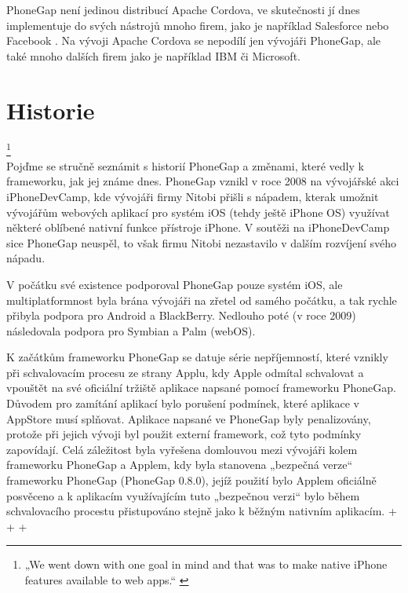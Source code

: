 PhoneGap není jedinou distribucí Apache Cordova, ve skutečnosti jí dnes implementuje do svých nástrojů mnoho firem, jako je například Salesforce nebo Facebook \cite{cordova_name}. Na vývoji Apache Cordova se nepodílí jen vývojáři PhoneGap, ale také mnoho dalších firem jako je například IBM či Microsoft.

\section{Historie}
\textit{\cite{phonegap_announcement}}
\footnote{„We went down with one goal in mind and that was to make native iPhone features available to web apps.“ \cite{phonegap_announcement}} \\

Pojďme se stručně seznámit s historií PhoneGap a změnami, které vedly k frameworku, jak jej známe dnes. PhoneGap vznikl v roce 2008 na vývojářské akci iPhoneDevCamp, kde vývojáři firmy Nitobi přišli s nápadem, kterak umožnit vývojářům webových aplikací pro systém iOS (tehdy ještě iPhone OS) využívat některé oblíbené nativní funkce přístroje iPhone. V soutěži na iPhoneDevCamp sice PhoneGap neuspěl, to však firmu Nitobi nezastavilo v dalším rozvíjení svého nápadu.

V počátku své existence podporoval PhoneGap pouze systém iOS, ale multiplatformnost byla brána vývojáři na zřetel od samého počátku, a tak rychle přibyla podpora pro Android a BlackBerry. Nedlouho poté (v roce 2009) následovala podpora pro Symbian a Palm (webOS).

K začátkům frameworku PhoneGap se datuje série nepříjemností, které vznikly při schvalovacím procesu ze strany Applu, kdy Apple odmítal schvalovat a vpouštět na své oficiální tržiště aplikace napsané pomocí frameworku PhoneGap. Důvodem pro zamítání aplikací bylo porušení podmínek, které aplikace v AppStore musí splňovat. Aplikace napsané ve PhoneGap byly penalizovány, protože při jejich vývoji byl použit externí framework, což tyto podmínky zapovídají. Celá záležitost byla vyřešena domlouvou mezi vývojáři kolem frameworku PhoneGap a Applem, kdy byla stanovena „bezpečná verze“ frameworku PhoneGap (PhoneGap 0.8.0), jejíž použití bylo Applem oficiálně posvěceno a k aplikacím využívajícím tuto „bezpečnou verzi“ bylo během schvalovacího procestu přistupováno stejně jako k běžným nativním aplikacím. \cite{open_letter_to_apple} + \cite{updates_on_apple} + \cite{phonegap_permitted_appstore} + \cite{phonegap_store_approval}

